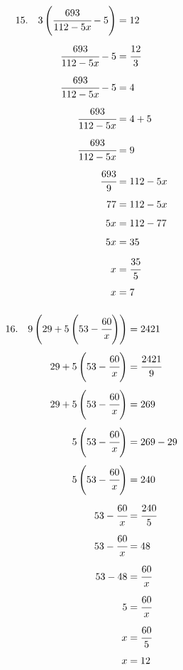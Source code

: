 \documentclass{article}
\begin{document}
\noindent
\begin{minipage}[t]{0.5000\textwidth}
\begin{align*}
15.\hspace{10pt}3\left(\cfrac{693}{112-5x}-5\right)&=12\\[4pt]
\cfrac{693}{112-5x}-5&=\cfrac{12}{3}\\[4pt]
\cfrac{693}{112-5x}-5&=4\\[4pt]
\cfrac{693}{112-5x}&=4+5\\[4pt]
\cfrac{693}{112-5x}&=9\\[4pt]
\cfrac{693}{9}&=112-5x\\[4pt]
77&=112-5x\\[4pt]
5x&=112-77\\[4pt]
5x&=35\\[4pt]
x&=\cfrac{35}{5}\\[4pt]
x&=7\\[4pt]
\end{align*}
\end{minipage}
\begin{minipage}[t]{0.5000\textwidth}
\begin{align*}
16.\hspace{10pt}9\left(29+5\left(53-\cfrac{60}{x}\right)\right)&=2421\\[4pt]
29+5\left(53-\cfrac{60}{x}\right)&=\cfrac{2421}{9}\\[4pt]
29+5\left(53-\cfrac{60}{x}\right)&=269\\[4pt]
5\left(53-\cfrac{60}{x}\right)&=269-29\\[4pt]
5\left(53-\cfrac{60}{x}\right)&=240\\[4pt]
53-\cfrac{60}{x}&=\cfrac{240}{5}\\[4pt]
53-\cfrac{60}{x}&=48\\[4pt]
53-48&=\cfrac{60}{x}\\[4pt]
5&=\cfrac{60}{x}\\[4pt]
x&=\cfrac{60}{5}\\[4pt]
x&=12\\[4pt]
\end{align*}
\end{minipage}
\vspace{10 mm}
\end{document}
